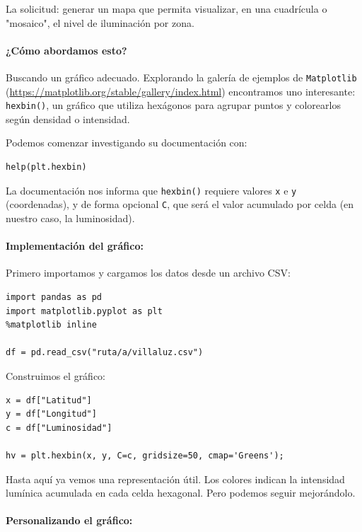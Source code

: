 \documentclass{article}
\theoremstyle{nonumberplain}
\begin{document}
La solicitud: generar un mapa que permita visualizar, en una cuadrícula o "mosaico", el nivel de iluminación por zona.

\paragraph{¿Cómo abordamos esto?} Buscando un gráfico adecuado. Explorando la galería de ejemplos de \texttt{Matplotlib} (\url{https://matplotlib.org/stable/gallery/index.html}) encontramos uno interesante: \texttt{hexbin()}, un gráfico que utiliza hexágonos para agrupar puntos y colorearlos según densidad o intensidad.

Podemos comenzar investigando su documentación con:

\begin{verbatim}
help(plt.hexbin)
\end{verbatim}

La documentación nos informa que \texttt{hexbin()} requiere valores \texttt{x} e \texttt{y} (coordenadas), y de forma opcional \texttt{C}, que será el valor acumulado por celda (en nuestro caso, la luminosidad).

\paragraph{Implementación del gráfico:}

Primero importamos y cargamos los datos desde un archivo CSV:

\begin{verbatim}
import pandas as pd
import matplotlib.pyplot as plt
%matplotlib inline

df = pd.read_csv("ruta/a/villaluz.csv")
\end{verbatim}

Construimos el gráfico:

\begin{verbatim}
x = df["Latitud"]
y = df["Longitud"]
c = df["Luminosidad"]

hv = plt.hexbin(x, y, C=c, gridsize=50, cmap='Greens');
\end{verbatim}

Hasta aquí ya vemos una representación útil. Los colores indican la intensidad lumínica acumulada en cada celda hexagonal. Pero podemos seguir mejorándolo.

\paragraph{Personalizando el gráfico:}
\end{document}
